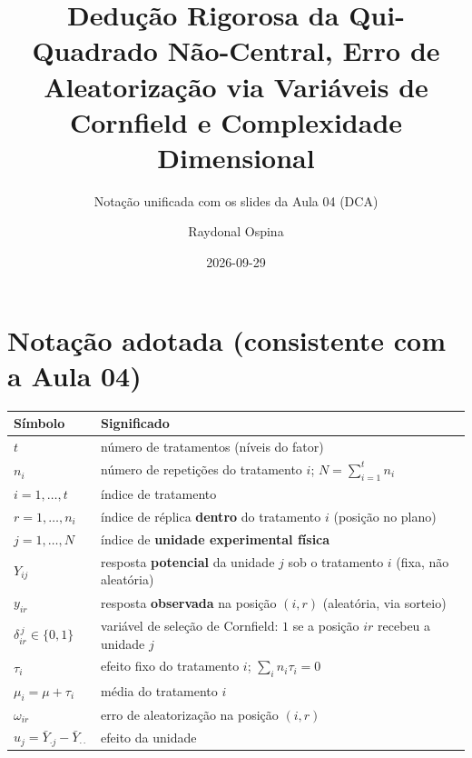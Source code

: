\documentclass[
]{article}
\title{Dedução Rigorosa da Qui-Quadrado Não-Central, Erro de
Aleatorização via Variáveis de Cornfield e Complexidade Dimensional}
\subtitle{Notação unificada com os slides da Aula 04 (DCA)}
\author{Raydonal Ospina}
\date{2026-09-29}
\newcounter{none} %
\begin{document}
\maketitle

{
\setcounter{tocdepth}{3}
\tableofcontents
}
\section{Notação adotada (consistente com a Aula
04)}\label{notauxe7uxe3o-adotada-consistente-com-a-aula-04}

{\def\LTcaptype{none} %
\begin{longtable}[]{@{}
  >{\raggedright\arraybackslash}p{}
  >{\raggedright\arraybackslash}p{}@{}}
\toprule\noalign{}
\begin{minipage}[b]{\linewidth}\raggedright
Símbolo
\end{minipage} & \begin{minipage}[b]{\linewidth}\raggedright
Significado
\end{minipage} \\
\midrule\noalign{}
\endhead
\bottomrule\noalign{}
\endlastfoot
\(t\) & número de tratamentos (níveis do fator) \\
\(n_i\) & número de repetições do tratamento \(i\);
\(N=\sum_{i=1}^{t} n_i\) \\
\(i=1,\dots,t\) & índice de tratamento \\
\(r=1,\dots,n_i\) & índice de réplica \textbf{dentro} do tratamento
\(i\) (posição no plano) \\
\(j=1,\dots,N\) & índice de \textbf{unidade experimental física} \\
\(Y_{ij}\) & resposta \textbf{potencial} da unidade \(j\) sob o
tratamento \(i\) (fixa, não aleatória) \\
\(y_{ir}\) & resposta \textbf{observada} na posição \((i,r)\)
(aleatória, via sorteio) \\
\(\delta_{ir}^{\,j}\in\{0,1\}\) & variável de seleção de Cornfield:
\(1\) se a posição \(ir\) recebeu a unidade \(j\) \\
\(\tau_i\) & efeito fixo do tratamento \(i\); \(\sum_i n_i\tau_i=0\) \\
\(\mu_i=\mu+\tau_i\) & média do tratamento \(i\) \\
\(\omega_{ir}\) & erro de aleatorização na posição \((i,r)\) \\
\(u_j=\bar Y_{\cdot j}-\bar Y_{\cdot\cdot}\) & efeito da unidade

\end{longtable}}
\end{document}

